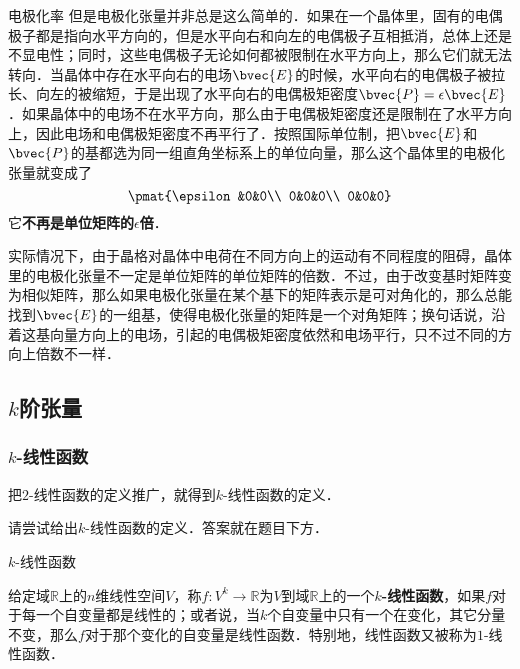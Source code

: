\begin{example}{电极化率}
但是电极化张量并非总是这么简单的．如果在一个晶体里，固有的电偶极子都是指向水平方向的，但是水平向右和向左的电偶极子互相抵消，总体上还是不显电性；同时，这些电偶极子无论如何都被限制在水平方向上，那么它们就无法转向．当晶体中存在水平向右的电场$\bvec{E}$的时候，水平向右的电偶极子被拉长、向左的被缩短，于是出现了水平向右的电偶极矩密度$\bvec{P}=\epsilon\bvec{E}$．如果晶体中的电场不在水平方向，那么由于电偶极矩密度还是限制在了水平方向上，因此电场和电偶极矩密度不再平行了．按照国际单位制，把$\bvec{E}$和$\bvec{P}$的基都选为同一组直角坐标系上的单位向量，那么这个晶体里的电极化张量就变成了
\begin{equation}
\pmat{\epsilon&0&0\\ 0&0&0\\ 0&0&0}
\end{equation}
它\textbf{不再是单位矩阵的$\epsilon$倍}．

实际情况下，由于晶格对晶体中电荷在不同方向上的运动有不同程度的阻碍，晶体里的电极化张量不一定是单位矩阵的单位矩阵的倍数．不过，由于改变基时矩阵变为相似矩阵，那么如果电极化张量在某个基下的矩阵表示是可对角化的，那么总能找到$\bvec{E}$的一组基，使得电极化张量的矩阵是一个对角矩阵；换句话说，沿着这基向量方向上的电场，引起的电偶极矩密度依然和电场平行，只不过不同的方向上倍数不一样．

\end{example}


\subsection{$k$阶张量}

\subsubsection{$k$-线性函数}

把$2$-线性函数的定义推广，就得到$k$-线性函数的定义．

\begin{exercise}{}
请尝试给出$k$-线性函数的定义．答案就在题目下方．
\end{exercise}

\begin{definition}{$k$-线性函数}

给定域$\mathbb{R}$上的$n$维线性空间$V$，称$f:V^k\rightarrow \mathbb{R}$为$V$到域$\mathbb{R}$上的一个\textbf{$k$-线性函数}，如果$f$对于每一个自变量都是线性的；或者说，当$k$个自变量中只有一个在变化，其它分量不变，那么$f$对于那个变化的自变量是线性函数．特别地，线性函数又被称为$1$-线性函数．

\end{definition}

